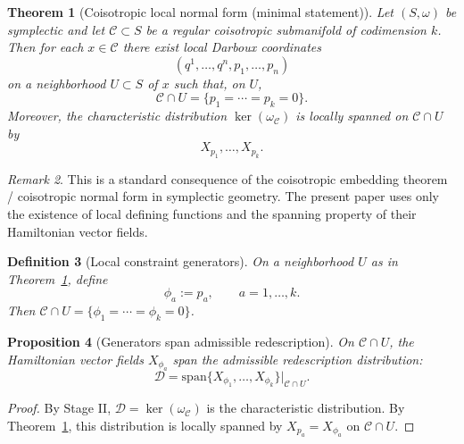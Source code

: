 \documentclass[11pt]{article}
\newtheorem{definition}{Definition}[section]
\newtheorem{proposition}[definition]{Proposition}
\newtheorem{theorem}[definition]{Theorem}
\theoremstyle{remark}
\newtheorem{remark}[definition]{Remark}
\theoremstyle{plain}
\begin{document}
\begin{theorem}[Coisotropic local normal form (minimal statement)]
\label{thm:coisotropic-normal}
Let $(S,\omega)$ be symplectic and let $\mathcal{C}\subset S$ be a regular coisotropic submanifold of codimension $k$.
Then for each $x\in\mathcal{C}$ there exist local Darboux coordinates
\[
(q^1,\dots,q^n,p_1,\dots,p_n)
\]
on a neighborhood $U\subset S$ of $x$ such that, on $U$,
\begin{equation}
\mathcal{C}\cap U = \{p_1=\cdots=p_k=0\}.
\label{eq:C-local}
\end{equation}
Moreover, the characteristic distribution $\ker(\omega_{\mathcal{C}})$ is locally spanned on $\mathcal{C}\cap U$ by
\begin{equation}
X_{p_1},\dots,X_{p_k}.
\label{eq:span-char}
\end{equation}
\end{theorem}

\begin{remark}
This is a standard consequence of the coisotropic embedding theorem / coisotropic normal form in symplectic geometry.
The present paper uses only the existence of local defining functions and the spanning property of their Hamiltonian vector fields.
\end{remark}

\begin{definition}[Local constraint generators]
\label{def:constraints}
On a neighborhood $U$ as in Theorem~\ref{thm:coisotropic-normal}, define
\begin{equation}
\phi_a := p_a,\qquad a=1,\dots,k.
\end{equation}
Then $\mathcal{C}\cap U=\{\phi_1=\cdots=\phi_k=0\}$.
\end{definition}

\begin{proposition}[Generators span admissible redescription]
\label{prop:spanD}
On $\mathcal{C}\cap U$, the Hamiltonian vector fields $X_{\phi_a}$ span the admissible redescription distribution:
\begin{equation}
\mathcal{D} = \mathrm{span}\{X_{\phi_1},\dots,X_{\phi_k}\}\Big|_{\mathcal{C}\cap U}.
\end{equation}
\end{proposition}

\begin{proof}
By Stage II, $\mathcal{D}=\ker(\omega_{\mathcal{C}})$ is the characteristic distribution.
By Theorem~\ref{thm:coisotropic-normal}, this distribution is locally spanned by $X_{p_a}=X_{\phi_a}$ on $\mathcal{C}\cap U$.
\end{proof}
\end{document}
